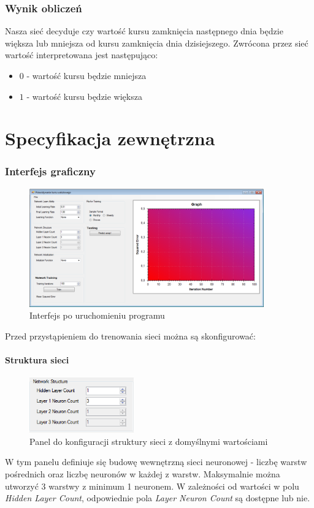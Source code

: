 \documentclass[a4paper]{article}
\begin{document}
		\section{Wynik obliczeń}
			Nasza sieć decyduje czy wartość kursu zamknięcia następnego dnia będzie większa lub mniejsza od kursu zamknięcia dnia dzisiejszego. Zwrócona przez sieć wartość interpretowana jest następująco:
			\begin{itemize}
				\item $ 0 $ - wartość kursu będzie mniejsza
				\item $ 1 $ - wartość kursu będzie większa
			\end{itemize}
		\newpage
	\part{Specyfikacja zewnętrzna}
		\section{Interfejs graficzny}
			\begin{figure}[h!]
				\centering
				\includegraphics[width=0.90\textwidth]{./img/GUI}
				\caption{Interfejs po uruchomieniu programu}
			\end{figure}
			Przed przystąpieniem do trenowania sieci można są skonfigurować:
			\subsection{Struktura sieci}
				\begin{figure}[h!]
					\centering
					\includegraphics[width=0.40\textwidth]{./img/GUI_network_structure}
					\caption{Panel do konfiguracji struktury sieci z domyślnymi wartościami}
				\end{figure}
				W tym panelu definiuje się budowę wewnętrzną sieci neuronowej - liczbę warstw pośrednich oraz liczbę neuronów w każdej z warstw. Maksymalnie można utworzyć 3 warstwy z minimum 1 neuronem. W zależności od wartości w polu \emph{Hidden Layer Count}, odpowiednie pola \emph{Layer Neuron Count} są dostępne lub nie.
			\newpage
\end{document}
